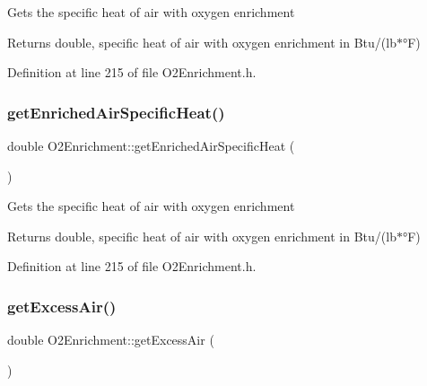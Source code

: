 Gets the specific heat of air with oxygen enrichment \begin{DoxyReturn}{Returns}
double, specific heat of air with oxygen enrichment in Btu/(lb$\ast$°F) 
\end{DoxyReturn}


Definition at line 215 of file O2\+Enrichment.\+h.

\mbox{\label{class_o2_enrichment_ac9fc3524b7243fbaac29884c1e6c5748}} 
\subsubsection{\texorpdfstring{get\+Enriched\+Air\+Specific\+Heat()}{getEnrichedAirSpecificHeat()}\hspace{0.1cm}{\footnotesize\ttfamily [3/3]}}
{\footnotesize\ttfamily double O2\+Enrichment\+::get\+Enriched\+Air\+Specific\+Heat (\begin{DoxyParamCaption}{ }\end{DoxyParamCaption})\hspace{0.3cm}{\ttfamily [inline]}}

Gets the specific heat of air with oxygen enrichment \begin{DoxyReturn}{Returns}
double, specific heat of air with oxygen enrichment in Btu/(lb$\ast$°F) 
\end{DoxyReturn}


Definition at line 215 of file O2\+Enrichment.\+h.

\mbox{\label{class_o2_enrichment_aba7923d4967cc1258ad6d078822f699a}} 
\subsubsection{\texorpdfstring{get\+Excess\+Air()}{getExcessAir()}\hspace{0.1cm}{\footnotesize\ttfamily [1/3]}}
{\footnotesize\ttfamily double O2\+Enrichment\+::get\+Excess\+Air (\begin{DoxyParamCaption}{ }\end{DoxyParamCaption})\hspace{0.3cm}{\ttfamily [inline]}}

